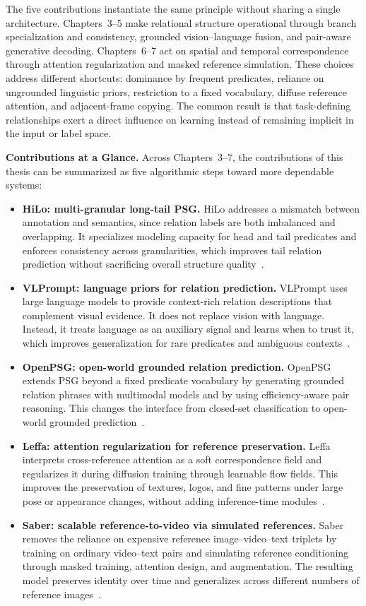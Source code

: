 The five contributions instantiate the same principle without sharing a single architecture. Chapters~3--5 make relational structure operational through branch specialization and consistency, grounded vision--language fusion, and pair-aware generative decoding. Chapters~6--7 act on spatial and temporal correspondence through attention regularization and masked reference simulation. These choices address different shortcuts: dominance by frequent predicates, reliance on ungrounded linguistic priors, restriction to a fixed vocabulary, diffuse reference attention, and adjacent-frame copying. The common result is that task-defining relationships exert a direct influence on learning instead of remaining implicit in the input or label space.

\noindent \textbf{Contributions at a Glance.}
Across Chapters~3--7, the contributions of this thesis can be summarized as five algorithmic steps toward more dependable systems:
\begin{itemize}
    \item \textbf{HiLo: multi-granular long-tail PSG.} HiLo addresses a mismatch between annotation and semantics, since relation labels are both imbalanced and overlapping. It specializes modeling capacity for head and tail predicates and enforces consistency across granularities, which improves tail relation prediction without sacrificing overall structure quality~\citep{zhou2023hilo}.
    \item \textbf{VLPrompt: language priors for relation prediction.} VLPrompt uses large language models to provide context-rich relation descriptions that complement visual evidence. It does not replace vision with language. Instead, it treats language as an auxiliary signal and learns when to trust it, which improves generalization for rare predicates and ambiguous contexts~\citep{zhou2025vlprompt}.
    \item \textbf{OpenPSG: open-world grounded relation prediction.} OpenPSG extends PSG beyond a fixed predicate vocabulary by generating grounded relation phrases with multimodal models and by using efficiency-aware pair reasoning. This changes the interface from closed-set classification to open-world grounded prediction~\citep{zhou2025openpsg}.
    \item \textbf{Leffa: attention regularization for reference preservation.} Leffa interprets cross-reference attention as a soft correspondence field and regularizes it during diffusion training through learnable flow fields. This improves the preservation of textures, logos, and fine patterns under large pose or appearance changes, without adding inference-time modules~\citep{zhou2025learning}.
    \item \textbf{Saber: scalable reference-to-video via simulated references.} Saber removes the reliance on expensive reference image--video--text triplets by training on ordinary video--text pairs and simulating reference conditioning through masked training, attention design, and augmentation. The resulting model preserves identity over time and generalizes across different numbers of reference images~\citep{zhou2025scaling}.
\end{itemize}
